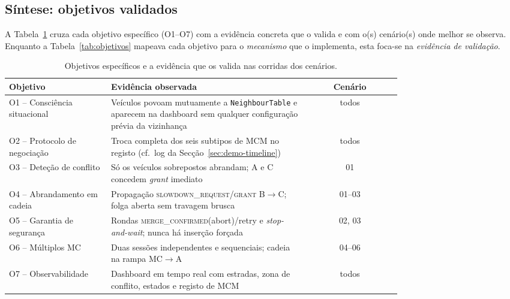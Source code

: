 \documentclass[11pt,a4paper]{article}
\begin{document}
\subsection{Síntese: objetivos validados}
\label{sec:res-sintese}

A Tabela~\ref{tab:res-objetivos} cruza cada objetivo específico (O1--O7) com a evidência
concreta que o valida e com o(s) cenário(s) onde melhor se observa. Enquanto a
Tabela~\ref{tab:objetivos} mapeava cada objetivo para o \emph{mecanismo} que o
implementa, esta foca-se na \emph{evidência de validação}.

\begin{table}[H]
  \centering
  \small
  \renewcommand{\arraystretch}{1.3}
  \begin{tabular}{@{}p{0.26\linewidth}p{0.50\linewidth}c@{}}
    \toprule
    \textbf{Objetivo} & \textbf{Evidência observada} & \textbf{Cenário} \\
    \midrule
    O1 -- Consciência situacional &
      Veículos povoam mutuamente a \texttt{NeighbourTable} e aparecem na dashboard sem
      qualquer configuração prévia da vizinhança & todos \\
    O2 -- Protocolo de negociação &
      Troca completa dos seis subtipos de MCM no registo (cf.\ log da
      Secção~\ref{sec:demo-timeline}) & todos \\
    O3 -- Deteção de conflito &
      Só os veículos sobrepostos abrandam; A e C concedem \emph{grant} imediato & 01 \\
    O4 -- Abrandamento em cadeia &
      Propagação \textsc{slowdown\_request}/\textsc{grant} B$\rightarrow$C; folga aberta
      sem travagem brusca & 01--03 \\
    O5 -- Garantia de segurança &
      Rondas \textsc{merge\_confirmed}(abort)/retry e \emph{stop-and-wait}; nunca há
      inserção forçada & 02, 03 \\
    O6 -- Múltiplos MC &
      Duas sessões independentes e sequenciais; cadeia na rampa MC$\rightarrow$A &
      04--06 \\
    O7 -- Observabilidade &
      Dashboard em tempo real com estradas, zona de conflito, estados e registo de MCM &
      todos \\
    \bottomrule
  \end{tabular}
  \caption{Objetivos específicos e a evidência que os valida nas corridas dos cenários.}
  \label{tab:res-objetivos}
\end{table}

\end{document}
